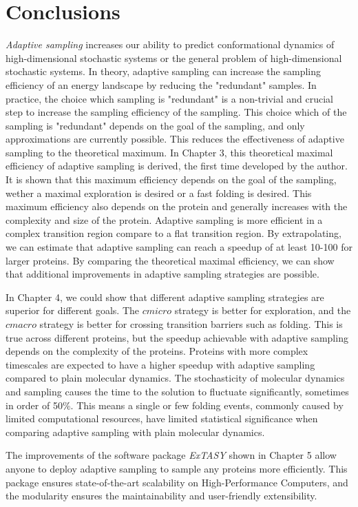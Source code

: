 \afterpage{\null\newpage}
\chapter{Conclusions}
\label{ch:conclude}
\emph{Adaptive sampling} increases our ability to predict conformational dynamics of high-dimensional stochastic systems or the general problem of high-dimensional stochastic systems. 
In theory, adaptive sampling can increase the sampling efficiency of an energy landscape by reducing the "redundant" samples. In practice, the choice which sampling is "redundant" is a non-trivial and crucial step to increase the sampling efficiency of the sampling. This choice which of the sampling is "redundant" depends on the goal of the sampling, and only approximations are currently possible. This reduces the effectiveness of adaptive sampling to the theoretical maximum. 
In Chapter 3, this theoretical maximal efficiency of adaptive sampling is derived, the first time developed by the author. It is shown that this maximum efficiency depends on the goal of the sampling, wether a maximal exploration is desired or a fast folding is desired. This maximum efficiency also depends on the protein and generally increases with the complexity and size of the protein. Adaptive sampling is more efficient in a complex transition region compare to a flat transition region. By extrapolating, we can estimate that adaptive sampling can reach a speedup of at least 10-100 for larger proteins. By comparing the theoretical maximal efficiency, we can show that additional improvements in adaptive sampling strategies are possible.

In Chapter 4, we could show that different adaptive sampling strategies are superior for different goals. The $cmicro$ strategy is better for exploration, and the $cmacro$ strategy is better for crossing transition barriers such as folding. This is true across different proteins, but the speedup achievable with adaptive sampling depends on the complexity of the proteins. Proteins with more complex timescales are expected to have a higher speedup with adaptive sampling compared to plain molecular dynamics. The stochasticity of molecular dynamics and sampling causes the time to the solution to fluctuate significantly, sometimes in order of 50\%. This means a single or few folding events, commonly caused by limited computational resources, have limited statistical significance when comparing adaptive sampling with plain molecular dynamics.

The improvements of the software package \emph{ExTASY} shown in Chapter 5 allow anyone to deploy adaptive sampling to sample any proteins more efficiently. This package ensures state-of-the-art scalability on High-Performance Computers, and the modularity ensures the maintainability and user-friendly extensibility.


